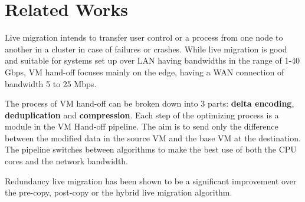\documentclass[conference]{IEEEtran}
\begin{document}
\section{Related Works}

Live migration intends to transfer user control or a process from one node to another in a cluster in case of failures or crashes. While live migration is good and suitable for systems set up over LAN having bandwidths in the range of 1-40 Gbps, VM hand-off \cite{elephant} focuses mainly on the edge, having a WAN connection of bandwidth 5 to 25 Mbps.

The process of VM hand-off \cite{elephant} can be broken down into 3 parts: \textbf{delta encoding}, \textbf{deduplication} and \textbf{compression}. Each step of the optimizing process is a module in the VM Hand-off pipeline. The aim is to send only the difference between the modified data in the source VM and the base VM at the destination. The pipeline switches between algorithms to make the best use of both the CPU cores and the network bandwidth.

Redundancy live migration \cite{redun_mig} has been shown to be a significant improvement over the pre-copy, post-copy or the hybrid live migration algorithm. 
    
    
    


\end{document}
